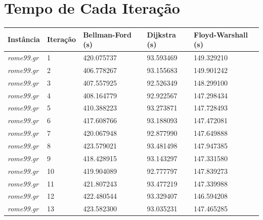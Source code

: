 \documentclass[12pt]{article}
\begin{document}
\section{Tempo de Cada Iteração} \label{sec:tabelas}
\begin{longtable}{l|l|lll}
    \hline
    \textbf{Instância} & \textbf{Iteração} & \textbf{Bellman-Ford (s)} & \textbf{Dijkstra (s)} & \textbf{Floyd-Warshall (s)} \\ \hline
\textit{rome99.gr}               &  1        & 420.075737             & 93.593469            & 149.329210                   \\
\textit{rome99.gr}               &  2        & 406.778267             & 93.155683            & 149.901242                   \\
\textit{rome99.gr}               &  3        & 407.557925             & 92.526349            & 148.299100                   \\
\textit{rome99.gr}               &  4        & 408.164779             & 92.922567            & 147.298434                   \\
\textit{rome99.gr}               &  5        & 410.388223             & 93.273871            & 147.728493                   \\
\textit{rome99.gr}               &  6        & 417.608766             & 93.188093            & 147.472081                   \\
\textit{rome99.gr}               &  7        & 420.067948             & 92.877990            & 147.649888                   \\
\textit{rome99.gr}               &  8        & 423.579021             & 93.481498            & 147.947385                   \\
\textit{rome99.gr}               &  9        & 418.428915             & 93.143297            & 147.331580                   \\
\textit{rome99.gr}               &  10       & 419.904089             & 92.777797            & 147.839273                   \\
\textit{rome99.gr}               &  11       & 421.807243             & 93.477219            & 147.339988                   \\
\textit{rome99.gr}               &  12       & 422.480544             & 93.329407            & 146.594208                   \\
\textit{rome99.gr}               &  13       & 423.582300             & 93.035231            & 147.465285                   \\

\end{longtable}
\end{document}
